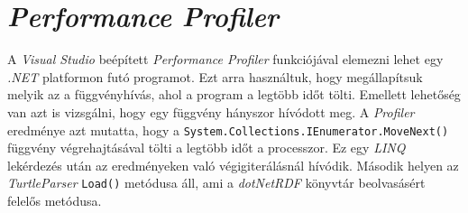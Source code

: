 \section{\emph{Performance Profiler}}

A \emph{Visual Studio} beépített \emph{Performance Profiler} funkciójával elemezni lehet egy \emph{.NET} platformon futó programot. Ezt arra használtuk, hogy megállapítsuk melyik az a függvényhívás, ahol a program a legtöbb időt tölti. Emellett lehetőség van azt is vizsgálni, hogy egy függvény hányszor hívódott meg. A \emph{Profiler} eredménye azt mutatta, hogy a \texttt{System.Collections.IEnumerator.MoveNext()} függvény végrehajtásával tölti a legtöbb időt a processzor. Ez egy \emph{LINQ} lekérdezés után az eredményeken való végigiterálásnál hívódik. Második helyen az \emph{TurtleParser} \texttt{Load()} metódusa áll, ami a \emph{dotNetRDF} könyvtár beolvasásért felelős metódusa.

%